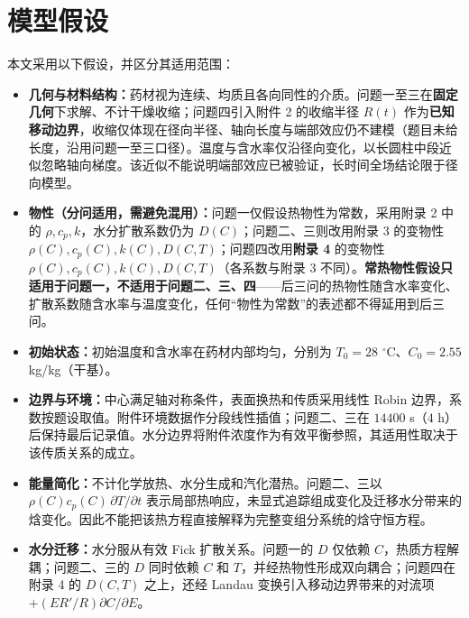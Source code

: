 \section{模型假设}
本文采用以下假设，并区分其适用范围：
\begin{itemize}
  \item \textbf{几何与材料结构：}药材视为连续、均质且各向同性的介质。问题一至三在\textbf{固定几何}下求解、不计干燥收缩；问题四引入附件 2 的收缩半径 $R(t)$ 作为\textbf{已知移动边界}，收缩仅体现在径向半径、轴向长度与端部效应仍不建模（题目未给长度，沿用问题一至三口径）。温度与含水率仅沿径向变化，以长圆柱中段近似忽略轴向梯度。该近似不能说明端部效应已被验证，长时间全场结论限于径向模型。
  \item \textbf{物性（分问适用，需避免混用）：}问题一仅假设热物性为常数，采用附录 2 中的 $\rho,c_p,k$，水分扩散系数仍为 $D(C)$；问题二、三则改用附录 3 的变物性 $\rho(C),c_p(C),k(C),D(C,T)$；问题四改用\textbf{附录 4} 的变物性 $\rho(C),c_p(C),k(C),D(C,T)$（各系数与附录 3 不同）。\textbf{常热物性假设只适用于问题一，不适用于问题二、三、四}——后三问的热物性随含水率变化、扩散系数随含水率与温度变化，任何“物性为常数”的表述都不得延用到后三问。
  \item \textbf{初始状态：}初始温度和含水率在药材内部均匀，分别为 $T_0=28$ $^\circ$C、$C_0=2.55$ kg/kg（干基）。
  \item \textbf{边界与环境：}中心满足轴对称条件，表面换热和传质采用线性 Robin 边界，系数按题设取值。附件环境数据作分段线性插值；问题二、三在 $14400$ s（$4$ h）后保持最后记录值。水分边界将附件浓度作为有效平衡参照，其适用性取决于该传质关系的成立。
  \item \textbf{能量简化：}不计化学放热、水分生成和汽化潜热。问题二、三以 $\rho(C)c_p(C)\,\partial T/\partial t$ 表示局部热响应，未显式追踪组成变化及迁移水分带来的焓变化。因此不能把该热方程直接解释为完整变组分系统的焓守恒方程。
  \item \textbf{水分迁移：}水分服从有效 Fick 扩散关系。问题一的 $D$ 仅依赖 $C$，热质方程解耦；问题二、三的 $D$ 同时依赖 $C$ 和 $T$，并经热物性形成双向耦合；问题四在附录 4 的 $D(C,T)$ 之上，还经 Landau 变换引入移动边界带来的对流项 $+(E R'/R)\partial C/\partial E$。
\end{itemize}
